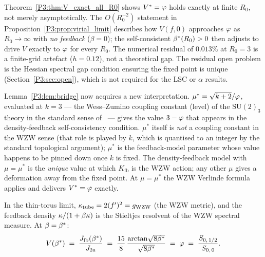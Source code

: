 \begin{remark}
\label{P3:rem:2d_thintorus_resolved}
Theorem~\ref{P3:thm:V_exact_all_R0} shows $V^* = \varphi$ holds exactly at finite $R_0$,
not merely asymptotically.  The $O(R_0^{-2})$ statement in
Proposition~\ref{P3:prop:virial_limit} describes how $V(f,0)$ approaches $\varphi$
as $R_0\to\infty$ with \emph{no feedback} ($\beta=0$); the self-consistent
$\beta^{*}(R_0) > 0$ then adjusts to drive $V$ exactly to $\varphi$ for every $R_0$.
The numerical residual of $0.013\%$ at $R_0=3$ is a finite-grid artefact
($h=0.12$), not a theoretical gap.  The residual open problem is the
Hessian spectral gap condition ensuring the fixed point is unique
(Section~\ref{P3:sec:open}), which is not required for the LSC or $\alpha$ results.
\end{remark}

\begin{remark}[Role of $\mu^* = \sqrt{k+2}/\vp$]
\label{P3:rem:mustar_role}
Lemma~\ref{P3:lem:bridge} now acquires a new interpretation.
$\mu^*=\sqrt{k+2}/\vp$, evaluated at $k=3$ --- the Wess--Zumino coupling
constant (level) of the $\mathrm{SU}(2)_3$ theory in the standard sense
of~\cite{Witten1984} --- gives the value $3-\varphi$ that appears in the
density-feedback self-consistency condition.
$\mu^*$ itself is \emph{not} a coupling constant in the WZW sense (that
role is played by $k$, which is quantised to an integer by the standard
topological argument); $\mu^*$ is the feedback-model parameter whose
value happens to be pinned down once $k$ is fixed.
The density-feedback model with $\mu = \mu^*$ is the \emph{unique} value
at which $K_{\mathrm{fb}}$ is the WZW action; any other $\mu$ gives a
deformation away from the fixed point.  At $\mu = \mu^*$ the WZW Verlinde
formula applies and delivers $V^* = \varphi$ exactly.
\end{remark}

\begin{proposition}
\label{P3:prop:res_primary}
In the thin-torus limit, $\kappa_{\mathrm{tube}} = 2(f')^2 = g_{\mathrm{WZW}}$
(the WZW metric), and the feedback density $\kappa/(1+\beta\kappa)$ is the
Stieltjes resolvent of the WZW spectral measure.  At $\beta=\beta^{*}$:
\begin{equation}
  V(\beta^{*}) \;=\; \frac{J_{\mathrm{fb}}(\beta^{*})}{J_{2a}}
  \;=\; \frac{15}{8}\,\frac{\arctan\!\sqrt{8\beta^{*}}}{\sqrt{8\beta^{*}}}
  \;=\; \varphi
  \;=\; \frac{S_{0,\,1/2}}{S_{0,\,0}}.
  \label{P3:eq:item_b}
\end{equation}
\end{proposition}

